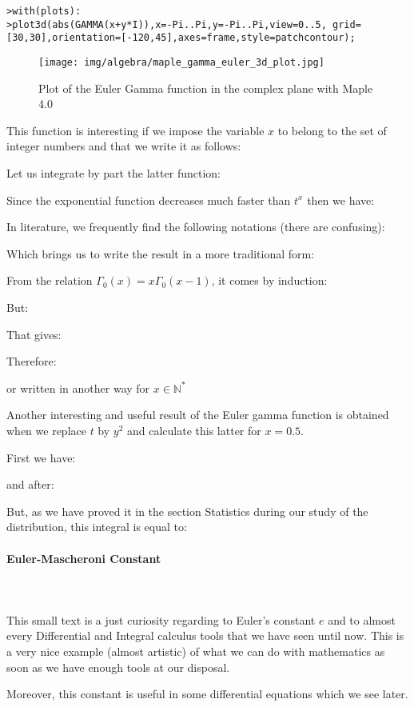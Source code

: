 	\texttt{>with(plots):\\}
	\texttt{>plot3d(abs(GAMMA(x+y*I)),x=-Pi..Pi,y=-Pi..Pi,view=0..5, grid=[30,30],orientation=[-120,45],axes=frame,style=patchcontour);}
	
	\begin{figure}[H]
		\centering
		\texttt{[image: img/algebra/maple\_gamma\_euler\_3d\_plot.jpg]}
		\caption{Plot of the Euler Gamma function in the complex plane with Maple 4.0}
	\end{figure}
	This function is interesting if we impose the variable $x$ to belong to the set of integer numbers and that we write it as follows:
	
	Let us integrate by part the latter function:
	
	Since the exponential function decreases much faster than $t^x$ then we have:
	
	In literature, we frequently find the following notations (there are confusing):
	
	Which brings us to write the result in a more traditional form:
	
	From the relation $\Gamma_{0}(x)=x\Gamma_{0}(x-1)$, it comes by induction:
	
	But:
	
	That gives:
	
	Therefore:
	
	or written in another way for $x\in \mathbb{N}^*$
	
	Another interesting and useful result of the Euler gamma function is obtained when we replace $t$ by $y^2$ and calculate this latter for $x=0.5$.
	
	First we have:
	
	and after:
	
	But, as we have proved it in the section Statistics during our study of  the distribution, this integral is equal to:
	
	
	\pagebreak
	\paragraph{Euler-Mascheroni Constant}\mbox{}\\\\
	This small text is a just curiosity regarding to Euler's constant $e$ and to almost every Differential and Integral calculus tools that we have seen until now. This is a very nice example (almost artistic) of what we can do with mathematics as soon as we have enough tools at our disposal.
	
	Moreover, this constant is useful in some differential equations which we see later.
	
